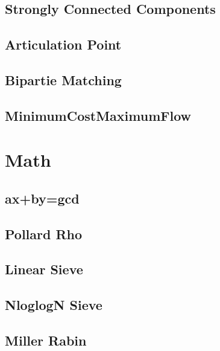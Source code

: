 \documentclass[a4paper,10pt,twocolumn,oneside]{article}
\begin{document}
\subsection{Strongly Connected Components}


\subsection{Articulation Point}


\subsection{Bipartie Matching}


\subsection{MinimumCostMaximumFlow}


\section{Math}
\subsection{ax+by=gcd}


\subsection{Pollard Rho}


\subsection{Linear Sieve}


\subsection{NloglogN Sieve}


\subsection{Miller Rabin}

\end{document}
